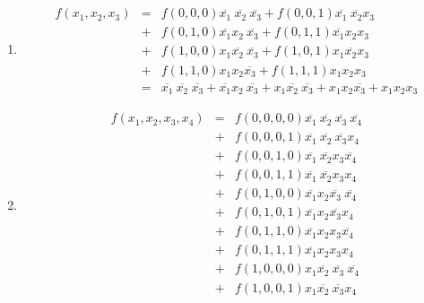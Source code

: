 \documentclass[DIN, pagenumber=false, fontsize=11pt, parskip=half]{scrartcl}
\begin{document}
    \subsection{}
    \begin{enumerate}[label=(\alph*)]
        \item 
            \begin{eqnarray*}
                f(x_1, x_2, x_3) &=& f(0, 0, 0) \overline{x_1} \ \overline{x_2} \ \overline{x_3} + f(0, 0, 1) \overline{x_1} \ \overline{x_2} x_3 \\ 
                &+& f(0, 1, 0) \overline{x_1} x_2 \ \overline{x_3} + f(0, 1, 1) \overline{x_1} x_2 x_3\\
                &+& f(1, 0, 0) x_1 \overline{x_2} \  \overline{x_3} + f(1, 0, 1) x_1 \overline{x_2} x_3\\
                &+& f(1, 1, 0) x_1 x_2 \overline{x_3} + f(1, 1, 1) x_1 x_2 x_3\\
                &=& \overline{x_1} \ \overline{x_2} \ \overline{x_3} + \overline{x_1} x_2 \ \overline{x_3} + x_1 \overline{x_2} \  \overline{x_3} + x_1 x_2 \overline{x_3} + x_1 x_2 x_3
            \end{eqnarray*}
        \item 
            \begin{eqnarray*}
                f(x_1, x_2, x_3, x_4) &=& f(0, 0, 0, 0) \overline{x_1} \ \overline{x_2} \ \overline{x_3} \ \overline{x_4} \\
                &+& f(0, 0, 0, 1) \overline{x_1} \ \overline{x_2} \ \overline{x_3} x_4\\
                &+& f(0, 0, 1, 0) \overline{x_1} \ \overline{x_2} x_3 \overline{x_4}\\
                &+& f(0, 0, 1, 1) \overline{x_1} \ \overline{x_2} x_3 x_4\\
                &+& f(0, 1, 0, 0) \overline{x_1} x_2 \overline{x_3} \ \overline{x_4}\\
                &+& f(0, 1, 0, 1) \overline{x_1} x_2 \overline{x_3} x_4\\
                &+& f(0, 1, 1, 0) \overline{x_1} x_2 x_3 \overline{x_4}\\
                &+& f(0, 1, 1, 1) \overline{x_1} x_2 x_3 x_4\\
                &+& f(1, 0, 0, 0) x_1 \overline{x_2} \ \overline{x_3} \ \overline{x_4}\\
                &+& f(1, 0, 0, 1) x_1 \overline{x_2} \ \overline{x_3} x_4\\

\end{eqnarray*}
\end{enumerate}
\end{document}
